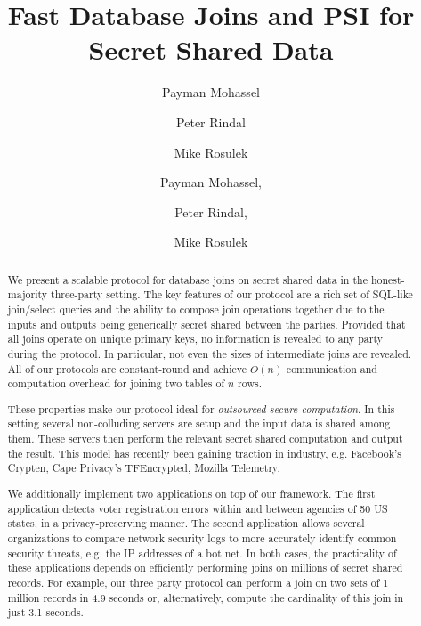 \documentclass[sigconf]{acmart}
\begin{document}
\title{Fast Database Joins and PSI for Secret Shared Data}

\ifccs
\author{Payman Mohassel}

\author{Peter Rindal}

\author{Mike Rosulek}

\else

\author{Payman Mohassel, \and Peter Rindal, \and Mike Rosulek }
\maketitle
\fi

\begin{abstract}
We present a scalable protocol for database joins on secret shared data in the honest-majority three-party setting. The key features of our protocol are a rich set of SQL-like join/select queries and the ability to compose join operations together due to the inputs and outputs being generically secret shared between the parties. Provided that all joins operate on unique primary keys, no information is revealed to any party during the protocol. In particular, not even the sizes of intermediate joins are revealed. All of our protocols are constant-round and achieve $O(n)$ communication and computation overhead for joining two tables of $n$ rows. 

These properties make our protocol ideal for \emph{outsourced secure computation}. In this setting several non-colluding servers are setup and the input data is shared among them. These servers then perform the relevant secret shared computation and output the result. This model has recently been gaining traction in industry, e.g. Facebook's Crypten, Cape Privacy's TFEncrypted, Mozilla Telemetry.

We additionally implement two applications on top of our framework. The first application detects voter registration errors within and between agencies of 50 US states, in a privacy-preserving manner. The second application allows several organizations to compare network security logs to more accurately identify common security threats, e.g. the IP addresses of a bot net. In both cases, the practicality of these applications depends on efficiently performing joins on millions of secret shared records. For example, our three party protocol can perform a join on two sets of 1 million records in 4.9 seconds or, alternatively, compute the cardinality of this join in just 3.1 seconds. 
\end{abstract}
\end{document}
